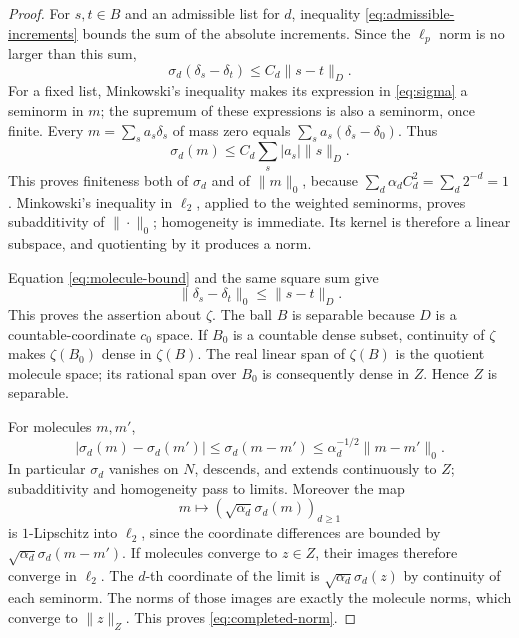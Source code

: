 \begin{proof}
For \(s,t\in B\) and an admissible list for \(d\), inequality
\eqref{eq:admissible-increments} bounds the sum of the absolute
increments. Since the \(\ell_p\) norm is no larger than this sum,
\begin{equation}
                 \sigma_d(\delta_s-\delta_t)
                         \leq C_d\|s-t\|_D.                  \label{eq:molecule-bound}
\end{equation}
For a fixed list, Minkowski's inequality makes its expression in
\eqref{eq:sigma} a seminorm in \(m\); the supremum of these expressions
is also a seminorm, once finite. Every \(m=\sum_s a_s\delta_s\)
of mass zero equals \(\sum_s a_s(\delta_s-\delta_0)\). Thus
\[
 \sigma_d(m)\leq C_d\sum_s|a_s|\|s\|_D.
\]
This proves finiteness both of \(\sigma_d\) and of \(\|m\|_0\),
because \(\sum_d\alpha_d C_d^2=\sum_d2^{-d}=1\).
Minkowski's inequality in \(\ell_2\), applied to the weighted
seminorms, proves subadditivity of \(\|\cdot\|_0\); homogeneity is
immediate. Its kernel is therefore a linear subspace, and quotienting
by it produces a norm.

Equation \eqref{eq:molecule-bound} and the same square sum give
\[
                   \|\delta_s-\delta_t\|_0\leq\|s-t\|_D.
\]
This proves the assertion about \(\zeta\). The ball \(B\) is separable
because \(D\) is a countable-coordinate \(c_0\) space. If \(B_0\) is
a countable dense subset, continuity of \(\zeta\) makes
\(\zeta(B_0)\) dense in \(\zeta(B)\). The real linear span of
\(\zeta(B)\) is the quotient molecule space; its rational span over
\(B_0\) is consequently dense in \(Z\). Hence \(Z\) is separable.

For molecules \(m,m'\),
\begin{equation}
 |\sigma_d(m)-\sigma_d(m')|
 \leq\sigma_d(m-m')\leq\alpha_d^{-1/2}\|m-m'\|_0.            \label{eq:sigma-continuity}
\end{equation}
In particular \(\sigma_d\) vanishes on \(N\), descends, and extends
continuously to \(Z\); subadditivity and homogeneity pass to limits.
Moreover the map
\[
 m\longmapsto(\sqrt{\alpha_d}\sigma_d(m))_{d\geq1}
\]
is \(1\)-Lipschitz into \(\ell_2\), since the coordinate differences
are bounded by \(\sqrt{\alpha_d}\sigma_d(m-m')\). If molecules
converge to \(z\in Z\), their images therefore converge in \(\ell_2\).
The \(d\)-th coordinate of the limit is
\(\sqrt{\alpha_d}\sigma_d(z)\) by continuity of each seminorm.
The norms of those images are exactly the molecule norms, which
converge to \(\|z\|_Z\). This proves \eqref{eq:completed-norm}.
\end{proof}

